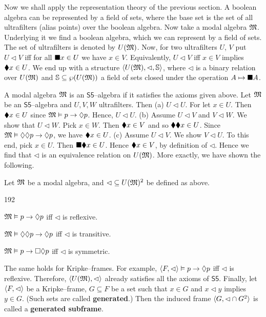 Now we shall apply the representation theory of the previous section.
A boolean algebra can be represented by a field of sets, where
the base set is the set of all ultrafilters (alias points) over
the boolean algebra. Now take a modal algebra $\mathfrak{M}$. Underlying it
we find a boolean algebra, which we can represent by a field of
sets. The set of ultrafilters is denoted by $U(\mathfrak{M})$. Now, for two
ultrafilters $U$, $V$ put $U \lhd V$ iff for all
$\blacksquare x \in U$ we have $x \in V$. Equivalently, $U \lhd V$ iff 
$x \in V$ implies $\blacklozenge x \in U$. We end up with a structure
$\langle U(\mathfrak{M}), \lhd, \mathbb{S}\rangle$, where $\lhd$ is a binary relation
over $U(\mathfrak{M})$ and $\mathbb{S} \subseteq \wp(U(\mathfrak{M}))$ a field of sets
closed under the operation $A \mapsto \blacksquare A$.

A modal algebra $\mathfrak{M}$ is an $\mathsf{S5}$--algebra if it satisfies
the axioms given above. Let $\mathfrak{M}$ be an $\mathsf{S5}$--algebra and $U, V, W$
ultrafilters. Then (a) $U \lhd U$. For let $x \in U$. Then
$\blacklozenge x \in U$ since $\mathfrak{M} \vDash p \rightarrow \lozenge p$. Hence, $U \lhd U$.
(b) Assume $U \lhd V$ and $V \lhd W$. We show that $U \lhd W$.
Pick $x \in W$. Then $\blacklozenge x \in V$ and so $\blacklozenge\blacklozenge x \in U$.
Since $\mathfrak{M} \vDash \lozenge \lozenge p \rightarrow \lozenge p$, we have $\blacklozenge x \in U$.
(c) Assume $U \lhd V$. We show $V \lhd U$. To this end, pick
$x \in U$. Then $\blacksquare \blacklozenge x \in U$. Hence $\blacklozenge x \in V$, by
definition of $\lhd$. Hence we find that $\lhd$ is an equivalence
relation on $U(\mathfrak{M})$. More exactly, we have shown the following.
\begin{prop}
Let $\mathfrak{M}$ be a modal algebra, and $\lhd \subseteq U(\mathfrak{M})^2$ be
defined as above.
\begin{dingautolist}{192}
\item $\mathfrak{M} \vDash p \rightarrow \lozenge p$ iff $\lhd$ is reflexive.
\item $\mathfrak{M} \vDash \lozenge\lozenge p \rightarrow \lozenge p$ iff $\lhd$ is
    transitive.
\item $\mathfrak{M} \vDash p \rightarrow \square\lozenge p$ iff $\lhd$ is symmetric.
\end{dingautolist}
\end{prop}
The same holds for Kripke--frames. For example,
$\langle F,\lhd\rangle \vDash p \rightarrow \lozenge p$ iff $\lhd$ is
reflexive. Therefore, $\langle U(\mathfrak{M}), \lhd\rangle$ already satisfies
all the axioms of $\mathsf{S5}$. Finally, let $\langle F, \lhd\rangle$ be a
Kripke--frame, $G \subseteq F$ be a set such that $x \in G$ and
$x \lhd y$ implies $y \in G$.
(Such sets are called \textbf{generated}.) Then the induced frame
$\langle G, \lhd \cap G^2\rangle$ is called a \textbf{generated subframe}.
